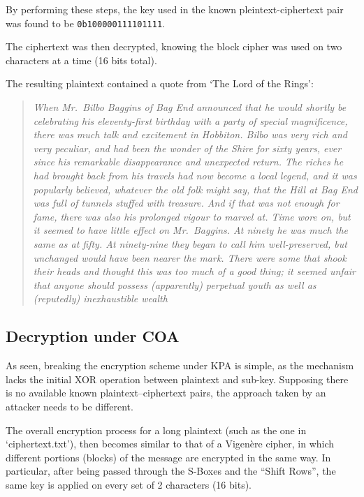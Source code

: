 \documentclass[12pt]{article}
\begin{document}
By performing these steps, the key used in the known pleintext-ciphertext pair was found to be \verb|0b100000111101111|.

The ciphertext was then decrypted, knowing the block cipher was used on two characters at a time (16 bits total).

The resulting plaintext contained a quote from `The Lord of the Rings':

\begin{quote}
   \textit{When Mr.\ Bilbo Baggins of Bag End announced that he would shortly be celebrating his eleventy-first birthday with a party of special magnificence, there was much talk and excitement in Hobbiton. 
   Bilbo was very rich and very peculiar, and had been the wonder of the Shire for sixty years, ever since his remarkable disappearance and unexpected return. 
   The riches he had brought back from his travels had now become a local legend, and it was popularly believed, whatever the old folk might say, that the Hill at Bag End was full of tunnels stuffed with treasure. 
   And if that was not enough for fame, there was also his prolonged vigour to marvel at. Time wore on, but it seemed to have little effect on Mr.\ Baggins.
   At ninety he was much the same as at fifty. 
   At ninety-nine they began to call him well-preserved, but unchanged would have been nearer the mark. 
   There were some that shook their heads and thought this was too much of a good thing; it seemed unfair that anyone should possess (apparently) perpetual youth as well as (reputedly) inexhaustible wealth}
\end{quote}

\subsection{Decryption under COA}
\label{sec:03.1}

As seen, breaking the encryption scheme under KPA is simple, as the mechanism lacks the initial XOR operation between plaintext and sub-key.
Supposing there is no available known plaintext–ciphertext pairs, the approach taken by an attacker needs to be different.

The overall encryption process for a long plaintext (such as the one in `ciphertext.txt'), then becomes similar to that of a Vigenère cipher, in which different portions (blocks) of the message are encrypted in the same way. In particular, after being passed through the S-Boxes and the ``Shift Rows'', the same key is applied on every set of 2 characters (16 bits).
\end{document}
